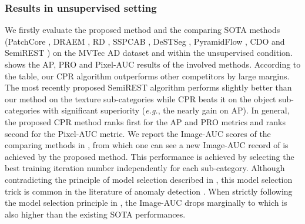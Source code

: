 \documentclass[lettersize,journal]{IEEEtran}
\begin{document}
\subsubsection{Results in unsupervised setting}
We firstly evaluate the proposed method and the  comparing SOTA methods (PatchCore
\cite{roth2022towards}, DRAEM \cite{zavrtanik2021draem}, RD \cite{deng2022anomaly}, SSPCAB
\cite{ristea2022self}, DeSTSeg \cite{zhang2023destseg}, PyramidFlow
\cite{lei2023pyramidflow}, CDO \cite{cao2023collaborative} and SemiREST \cite{li2023efficient}) on the
MVTec AD dataset \cite{Bergmann_2019_CVPR} and within the unsupervised condition.
 shows the AP, PRO and Pixel-AUC results of the involved methods.
According to the table, our CPR algorithm outperforms other competitors by large margins.
The most recently proposed SemiREST algorithm \cite{li2023efficient} performs slightly
better than our method on the texture sub-categories while CPR beats it on the object
sub-categories with significant superiority (\emph{e.g.}, the nearly  gain on AP). In
general, the proposed CPR method ranks first for the AP and PRO metrics and ranks
second for the Pixel-AUC metric. We report the Image-AUC scores of the comparing methods
in , from which one can see a new Image-AUC record of
 is achieved by the proposed method. This performance is achieved by selecting the
best training iteration number independently for each sub-category. Although contradicting
the principle of model selection described in , this model
selection trick is common in the literature of anomaly detection
\cite{gudovskiy2022cflow, Liu_2023_CVPR, cao2023collaborative}. When strictly following the model
selection principle in , the Image-AUC drops marginally to
 which is also higher than the existing SOTA performances.
\end{document}
